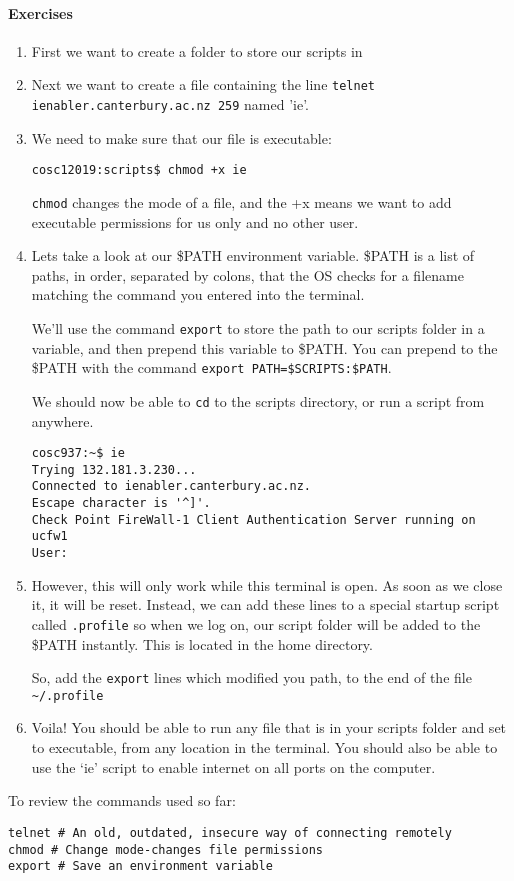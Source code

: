 \documentclass{article}
\begin{document}
\paragraph{Exercises}
\begin{enumerate}
\item First we want to create a folder to store our scripts in
\item Next we want to create a file containing the line
\texttt{telnet ienabler.canterbury.ac.nz 259} named 'ie'.
\item We need to make sure that our file is executable:
\begin{verbatim}
cosc12019:scripts$ chmod +x ie
\end{verbatim}
\texttt{chmod} changes the mode of a file, and the +x means we want to add executable permissions for us only and no other user.

\item Lets take a look at our \$PATH environment variable. \$PATH is a list of paths, in order, separated by colons, that the OS checks for a filename matching the command you entered into the terminal.

We'll use the command \texttt{export} to store the path to our scripts folder in a variable, and then prepend this variable to \$PATH. 
You can prepend to the \$PATH with the command \texttt{export PATH=\$SCRIPTS:\$PATH}.

We should now be able to \texttt{cd} to the scripts directory, or run a script from anywhere.
\begin{verbatim}
cosc937:~$ ie
Trying 132.181.3.230...
Connected to ienabler.canterbury.ac.nz.
Escape character is '^]'.
Check Point FireWall-1 Client Authentication Server running on ucfw1
User: 
\end{verbatim}
\item However, this will only work while this terminal is open. As soon as we close it, it will be reset. Instead, we can add these lines to a special startup script called \texttt{.profile} so when we log on, our script folder will be added to the \$PATH instantly. This is located in the home directory.

So, add the \texttt{export} lines which modified you path, to the end of the file \texttt{\textasciitilde/.profile}
\item Voila! You should be able to run any file that is in your scripts folder and set to executable, from any location in the terminal. You should also be able to use the `ie' script to enable internet on all ports on the computer.
\end{enumerate}
To review the commands used so far:
\begin{verbatim}
telnet # An old, outdated, insecure way of connecting remotely
chmod # Change mode-changes file permissions
export # Save an environment variable
\end{verbatim}
\end{document}
